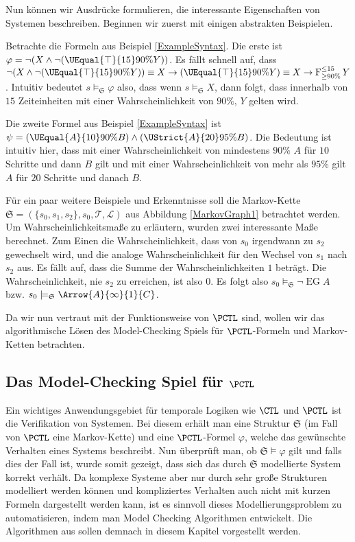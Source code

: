 Nun können wir Ausdrücke formulieren, die interessante Eigenschaften von Systemen beschreiben. Beginnen wir zuerst mit einigen abstrakten Beispielen.
\begin{example}
	\label{PCTLBeispiel}
	Betrachte die Formeln aus Beispiel \ref{ExampleSyntax}. Die erste ist $\varphi = \neg(X \land \neg(\UEqual{\top}{15}{90\%}{Y}))$.
	Es fällt schnell auf, dass $\neg(X \land \neg(\UEqual{\top}{15}{90\%}{Y})) \equiv X \rightarrow (\UEqual{\top}{15}{90\%}{Y}) \equiv X \rightarrow \operatorname{F}^{\leq 15}_{\geq 90\%}Y$.
	Intuitiv bedeutet $s\models_\mathfrak{S} \varphi$ also, dass wenn $s\models_\mathfrak{S} X$, dann folgt, dass innerhalb von $15$ Zeiteinheiten mit einer Wahrscheinlichkeit von $90\%$, $Y$ gelten wird.
	
	Die zweite Formel aus Beispiel \ref{ExampleSyntax} ist $\psi=(\UEqual{A}{10}{90\%}{B})\land(\UStrict{A}{20}{95\%}{B})$. 
	Die Bedeutung ist intuitiv hier, dass mit einer Wahrscheinlichkeit von mindestens $90\%$ $A$ für $10$ Schritte und dann $B$ gilt und mit einer Wahrscheinlichkeit von mehr als $95\%$ gilt $A$ für $20$ Schritte und danach $B$.
	
	Für ein paar weitere Beispiele und Erkenntnisse soll die Markov-Kette $\mathfrak{S}=(\{s_0, s_1,s_2\}, s_0, \mathcal{T},\mathcal{L})$ aus Abbildung \ref{MarkovGraph1} betrachtet werden.
	Um Wahrscheinlichkeitsmaße zu erläutern, wurden zwei interessante Maße berechnet. 
	Zum Einen die Wahrscheinlichkeit, dass von $s_0$ irgendwann zu $s_2$ gewechselt wird, und die analoge Wahrscheinlichkeit für den Wechsel von $s_1$ nach $s_2$ aus. 
	Es fällt auf, dass die Summe der Wahrscheinlichkeiten $1$ beträgt. Die Wahrscheinlichkeit, nie $s_2$ zu erreichen, ist also $0$.
	Es folgt also $s_0\models_\mathfrak{S} \neg\operatorname{EG}A$ bzw. $s_0\models_\mathfrak{S} \Arrow{A}{\infty}{1}{C}$.
\end{example}

Da wir nun vertraut mit der Funktionsweise von $\PCTL$ sind, wollen wir das algorithmische Lösen des Model-Checking Spiels für $\PCTL$-Formeln und Markov-Ketten betrachten.

\subsection{Das Model-Checking Spiel für $\PCTL$}
\label{ChapMCAlgs}

Ein wichtiges Anwendungsgebiet für temporale Logiken wie $\CTL$ und $\PCTL$ ist die Verifikation von Systemen. 
Bei diesem erhält man eine Struktur $\mathfrak{S}$ (im Fall von $\PCTL$ eine Markov-Kette) und eine $\PCTL$-Formel $\varphi$, welche das gewünschte Verhalten eines Systems beschreibt. 
Nun überprüft man, ob $\mathfrak{S}\models \varphi$ gilt und falls dies der Fall ist, wurde somit gezeigt, dass sich das durch $\mathfrak{S}$ modellierte System korrekt verhält.
Da komplexe Systeme aber nur durch sehr große Strukturen modelliert werden können und kompliziertes Verhalten auch nicht mit kurzen Formeln dargestellt werden kann, ist es sinnvoll dieses Modellierungsproblem zu automatisieren, indem man Model Checking Algorithmen entwickelt. 
Die Algorithmen aus \cite{hansson1994logic} sollen demnach in diesem Kapitel vorgestellt werden.


